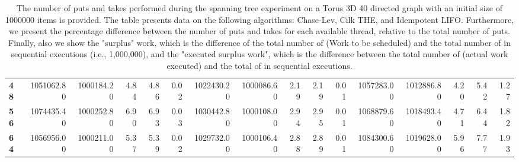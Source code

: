 \begin{table}[!ht]
{\begin{tabular}{lrrrrrrrrrrrrrrr}
\textbf{48} & 1051062.80 & 1000184.20 &           4.84 &        4.86 &                 0.02 & 1022430.20 & 1000086.60 &           2.19 &        2.19 &                 0.01 &      1057283.00 & 1012886.80 &           4.20 &        5.42 &                 1.27 \\
\textbf{56} & 1074435.40 & 1000252.80 &           6.90 &        6.93 &                 0.03 & 1030442.80 & 1000108.00 &           2.94 &        2.95 &                 0.01 &      1068879.60 & 1018493.40 &           4.71 &        6.44 &                 1.82 \\
\textbf{64} & 1056956.00 & 1000211.00 &           5.37 &        5.39 &                 0.02 & 1029732.00 & 1000106.40 &           2.88 &        2.89 &                 0.01 &      1084300.60 & 1019628.00 &           5.96 &        7.77 &                 1.93 \\
\bottomrule
\end{tabular}}
\label{difference-Torus_3D_40_directed-1000000-CHASELEV-CILK-IDEMPOTENT_LIFO}
\caption{The number of puts and takes performed during the
    spanning tree experiment on a Torus 3D 40 directed graph with an initial size
    of 1000000 items is provided. The table presents data on the
    following algorithms: Chase-Lev, Cilk THE, and
    Idempotent LIFO. Furthermore, we present the percentage difference
    between the number of puts and takes for each available thread,
    relative to the total number of puts. Finally, also we show the
    "surplus" work, which is the difference of the total number of
    \Puts (Work to be scheduled) and the total number of \Puts in
    sequential executions (i.e., 1,000,000), and the "executed surplus
    work", which is the difference between the total number of \Takes
    (actual work executed) and the total of \Takes in sequential
    executions.}
\end{table}
